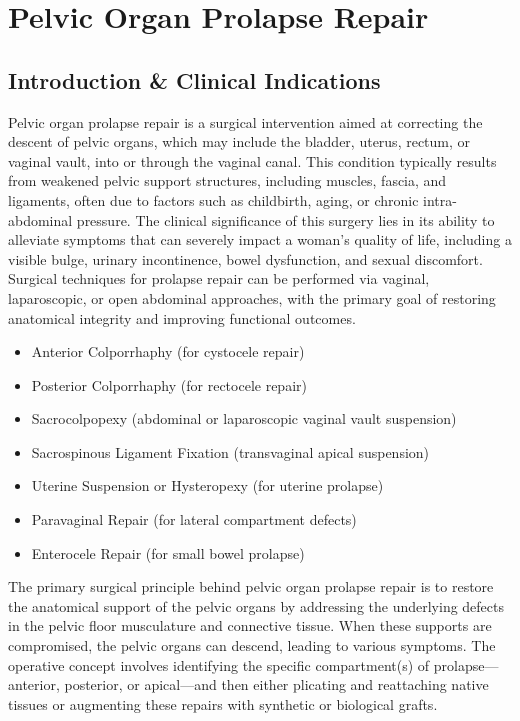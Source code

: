 \chapter{Pelvic Organ Prolapse Repair}

\section*{Introduction \& Clinical Indications}
Pelvic organ prolapse repair is a surgical intervention aimed at correcting the descent of pelvic organs, which may include the bladder, uterus, rectum, or vaginal vault, into or through the vaginal canal. This condition typically results from weakened pelvic support structures, including muscles, fascia, and ligaments, often due to factors such as childbirth, aging, or chronic intra-abdominal pressure. The clinical significance of this surgery lies in its ability to alleviate symptoms that can severely impact a woman's quality of life, including a visible bulge, urinary incontinence, bowel dysfunction, and sexual discomfort. Surgical techniques for prolapse repair can be performed via vaginal, laparoscopic, or open abdominal approaches, with the primary goal of restoring anatomical integrity and improving functional outcomes.

\begin{itemize}
  \item Anterior Colporrhaphy (for cystocele repair)
  \item Posterior Colporrhaphy (for rectocele repair)
  \item Sacrocolpopexy (abdominal or laparoscopic vaginal vault suspension)
  \item Sacrospinous Ligament Fixation (transvaginal apical suspension)
  \item Uterine Suspension or Hysteropexy (for uterine prolapse)
  \item Paravaginal Repair (for lateral compartment defects)
  \item Enterocele Repair (for small bowel prolapse)
\end{itemize}

The primary surgical principle behind pelvic organ prolapse repair is to restore the anatomical support of the pelvic organs by addressing the underlying defects in the pelvic floor musculature and connective tissue. When these supports are compromised, the pelvic organs can descend, leading to various symptoms. The operative concept involves identifying the specific compartment(s) of prolapse—anterior, posterior, or apical—and then either plicating and reattaching native tissues or augmenting these repairs with synthetic or biological grafts.

